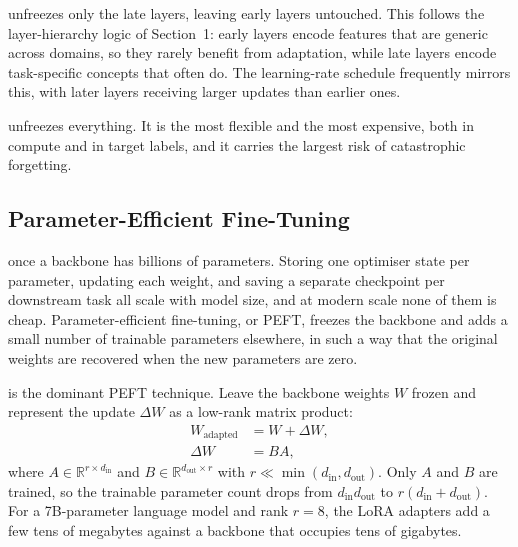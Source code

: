  unfreezes only the late layers, leaving early layers untouched. This follows the layer-hierarchy logic of Section~1: early layers encode features that are generic across domains, so they rarely benefit from adaptation, while late layers encode task-specific concepts that often do. The learning-rate schedule frequently mirrors this, with later layers receiving larger updates than earlier ones.

 unfreezes everything. It is the most flexible and the most expensive, both in compute and in target labels, and it carries the largest risk of catastrophic forgetting.


\subsection{Parameter-Efficient Fine-Tuning}

 once a backbone has billions of parameters. Storing one optimiser state per parameter, updating each weight, and saving a separate checkpoint per downstream task all scale with model size, and at modern scale none of them is cheap. Parameter-efficient fine-tuning, or PEFT, freezes the backbone and adds a small number of trainable parameters elsewhere, in such a way that the original weights are recovered when the new parameters are zero.

\cite{Hu2021LoRA} is the dominant PEFT technique. Leave the backbone weights $W$ frozen and represent the update $\Delta W$ as a low-rank matrix product:
\begin{align*}
    W_{\text{adapted}} &= W + \Delta W, \\
    \Delta W &= B A,
\end{align*}
where $A \in \mathbb{R}^{r \times d_{\text{in}}}$ and $B \in \mathbb{R}^{d_{\text{out}} \times r}$ with $r \ll \min(d_{\text{in}}, d_{\text{out}})$. Only $A$ and $B$ are trained, so the trainable parameter count drops from $d_{\text{in}} d_{\text{out}}$ to $r(d_{\text{in}}{+}d_{\text{out}})$. For a 7B-parameter language model and rank $r{=}8$, the LoRA adapters add a few tens of megabytes against a backbone that occupies tens of gigabytes.


